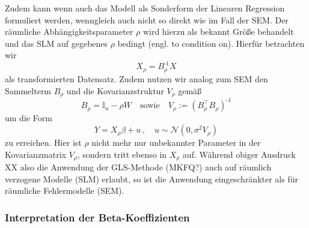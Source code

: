 Zudem kann wenn auch das Modell als Sonderform der Linearen Regression formuliert werden, wenngleich auch 
nicht so direkt wie im Fall der SEM. Der räumliche Abhängigkeitsparameter $\rho$ wird hierzu als bekannt Größe
behandelt und das SLM auf gegebenes $\rho$ bedingt (engl. to condition on). Hierfür betrachten wir
\begin{equation*}
    X_{\rho}=B_{\rho}^{\text{-1}} X
\end{equation*}
als transformierten Datensatz. Zudem nutzen wir analog zum SEM den Sammelterm $B_{\rho}$ und 
die Kovarianzstruktur $V_{\rho}$ gemäß
\begin{equation*}
    B_{\rho}=\mathds{I}_{n}-\rho W \quad \text{sowie} \quad V_{\rho} := (B_{\rho}^{\intercal} B_{\rho})^{\text{-1}}
\end{equation*}
um die Form
\begin{equation}
    Y=X_{\rho} \beta + u \, , \quad u \sim \mathcal{N}(0,\sigma^{2} V_{\rho})
\end{equation}
zu erreichen. Hier ist $\rho$ nicht mehr nur unbekannter Parameter in der Kovarianzmatrix $V_{\rho}$, 
sondern tritt ebenso in $X_{\rho}$ auf. Während obiger Ausdruck XX also die Anwendung der 
GLS-Methode (MKFQ?) auch auf räumlich verzogene Modelle (SLM) erlaubt, so ist die Anwendung eingeschränkter als 
für räumliche Fehlermodelle (SEM).

\subsubsection{Interpretation der Beta-Koeffizienten}

